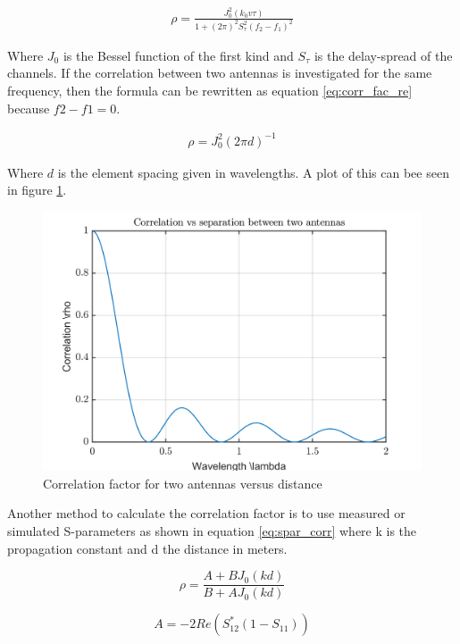 \begin{eqnarray} \label{eq:corr_fac}
\rho = \frac{J_0^2( k_0 v \tau)}{1+(2\pi)^2 S_\tau^2(f_2 - f_1)^2 }
\end{eqnarray}      

Where $J_0$ is the Bessel function of the first kind and $S_\tau$ is the delay-spread of the channels. If the correlation between two antennas is investigated for the same frequency, then the formula can be rewritten as equation \ref{eq:corr_fac_re} because $f2-f1=0$.

\begin{eqnarray} \label{eq:corr_fac_re}
\rho = J_0^2( 2\pi d)^{-1}
\end{eqnarray} 

Where $d$ is the element spacing given in wavelengths. A plot of this can bee seen in figure \ref{fig:correlation}.

\begin{figure}[H]
\centering 
\includegraphics[scale = 0.7]{figures/ch1/correlation.png}
\caption{Correlation factor for two antennas versus distance}
\label{fig:correlation}
\end{figure}

Another method to calculate the correlation factor is to use measured or simulated S-parameters as shown in equation \ref{eq:spar_corr} \citep{wang2011} where k is the propagation constant and d the distance in meters. 

\begin{equation} \label{eq:spar_corr}
\rho = \frac{A+B J_0(kd)}{B+A J_0(kd)}
\end{equation}

\begin{equation} 
A = -2Re(S_{12}^*(1-S_{11}))
\end{equation}

